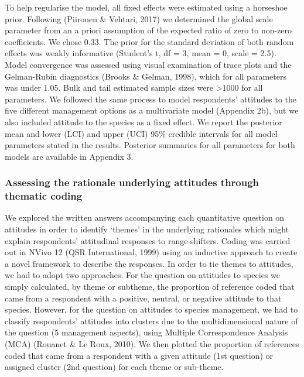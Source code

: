 \documentclass[
]{article}
\begin{document}
To help regularise the model, all fixed effects were estimated using a
horseshoe prior. Following (Piironen \& Vehtari, 2017) we determined the
global scale parameter from an a priori assumption of the expected ratio
of zero to non-zero coefficients. We chose 0.33. The prior for the
standard deviation of both random effects was weakly informative
(Student's t, df = 3, mean = 0, scale = 2.5). Model convergence was
assessed using visual examination of trace plots and the Gelman-Rubin
diagnostics (Brooks \& Gelman, 1998), which for all parameters was under
1.05. Bulk and tail estimated sample sizes were \textgreater1000 for all
parameters. We followed the same process to model respondents' attitudes
to the five different management options as a multivariate model
(Appendix 2b), but we also included attitude to the species as a fixed
effect. We report the posterior mean and lower (LCI) and upper (UCI)
95\% credible intervals for all model parameters stated in the results.
Posterior summaries for all parameters for both models are available in
Appendix 3.

\hypertarget{assessing-the-rationale-underlying-attitudes-through-thematic-coding}{%
\subsubsection{Assessing the rationale underlying attitudes through
thematic
coding}\label{assessing-the-rationale-underlying-attitudes-through-thematic-coding}}

We explored the written answers accompanying each quantitative question
on attitudes in order to identify `themes' in the underlying rationales
which might explain respondents' attitudinal responses to
range-shifters. Coding was carried out in NVivo 12 (QSR International,
1999) using an inductive approach to create a novel framework to
describe the responses. In order to tie themes to attitudes, we had to
adopt two approaches. For the question on attitudes to species we simply
calculated, by theme or subtheme, the proportion of reference coded that
came from a respondent with a positive, neutral, or negative attitude to
that species. However, for the question on attitudes to species
management, we had to classify respondents' attitudes into clusters due
to the multidimensional nature of the question (5 management aspects),
using Multiple Correspondence Analysis (MCA) (Rouanet \& Le Roux, 2010).
We then plotted the proportion of references coded that came from a
respondent with a given attitude (1st question) or assigned cluster (2nd
question) for each theme or sub-theme.
\end{document}
